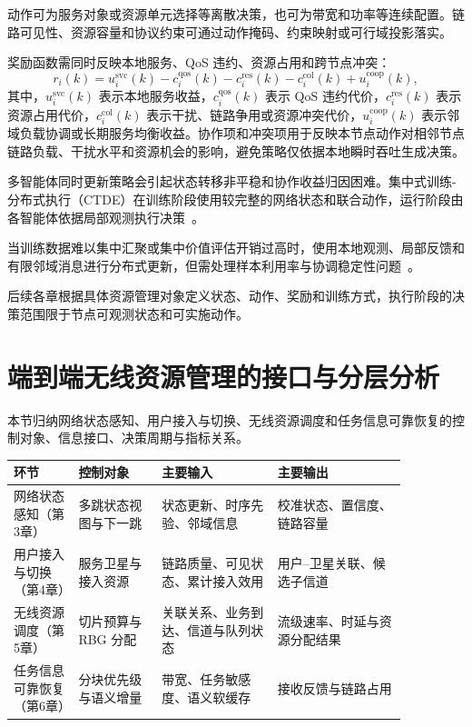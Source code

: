 动作可为服务对象或资源单元选择等离散决策，也可为带宽和功率等连续配置。链路可见性、资源容量和协议约束可通过动作掩码、约束映射或可行域投影落实。

奖励函数需同时反映本地服务、QoS 违约、资源占用和跨节点冲突：
\begin{equation}
    r_i(k)
    =
    u_i^{\mathrm{svc}}(k)
    -
    c_i^{\mathrm{qos}}(k)
    -
    c_i^{\mathrm{res}}(k)
    -
    c_i^{\mathrm{col}}(k)
    +
    u_i^{\mathrm{coop}}(k),
\end{equation}
其中，$u_i^{\mathrm{svc}}(k)$ 表示本地服务收益，$c_i^{\mathrm{qos}}(k)$ 表示 QoS 违约代价，$c_i^{\mathrm{res}}(k)$ 表示资源占用代价，$c_i^{\mathrm{col}}(k)$ 表示干扰、链路争用或资源冲突代价，$u_i^{\mathrm{coop}}(k)$ 表示邻域负载协调或长期服务均衡收益。协作项和冲突项用于反映本节点动作对相邻节点链路负载、干扰水平和资源机会的影响，避免策略仅依据本地瞬时吞吐生成决策。

多智能体同时更新策略会引起状态转移非平稳和协作收益归因困难。集中式训练-分布式执行（CTDE）在训练阶段使用较完整的网络状态和联合动作，运行阶段由各智能体依据局部观测执行决策~\cite{kraemer2016multiagentreinforcementlearning}。

当训练数据难以集中汇聚或集中价值评估开销过高时，使用本地观测、局部反馈和有限邻域消息进行分布式更新，但需处理样本利用率与协调稳定性问题~\cite{zhang2018fullydecentralizedmultiagentreinforcement}。

后续各章根据具体资源管理对象定义状态、动作、奖励和训练方式，执行阶段的决策范围限于节点可观测状态和可实施动作。

\section{端到端无线资源管理的接口与分层分析}
\label{subsec:ch2_e2e_loop}

本节归纳网络状态感知、用户接入与切换、无线资源调度和任务信息可靠恢复的控制对象、信息接口、决策周期与指标关系。

\begin{table}[!htp]
\centering
{}
\label{tab:ch2_e2e_interfaces}
\footnotesize
\setlength{\tabcolsep}{3pt}
\renewcommand{\arraystretch}{1.18}
\begin{tabular}{p{0.14\linewidth} p{0.18\linewidth} p{0.25\linewidth} p{0.29\linewidth}}
\toprule
环节 & 控制对象 & 主要输入 & 主要输出 \\
\midrule
网络状态感知（第3章）
& 多跳状态视图与下一跳
& 状态更新、时序先验、邻域信息
& 校准状态、置信度、链路容量 \\
用户接入与切换（第4章）
& 服务卫星与接入资源
& 链路质量、可见状态、累计接入效用
& 用户--卫星关联、候选子信道 \\
无线资源调度（第5章）
& 切片预算与 RBG 分配
& 关联关系、业务到达、信道与队列状态
& 流级速率、时延与资源分配结果 \\
任务信息可靠恢复（第6章）
& 分块优先级与语义增量
& 带宽、任务敏感度、语义软缓存
& 接收反馈与链路占用 \\
\bottomrule
\end{tabular}
\end{table}

